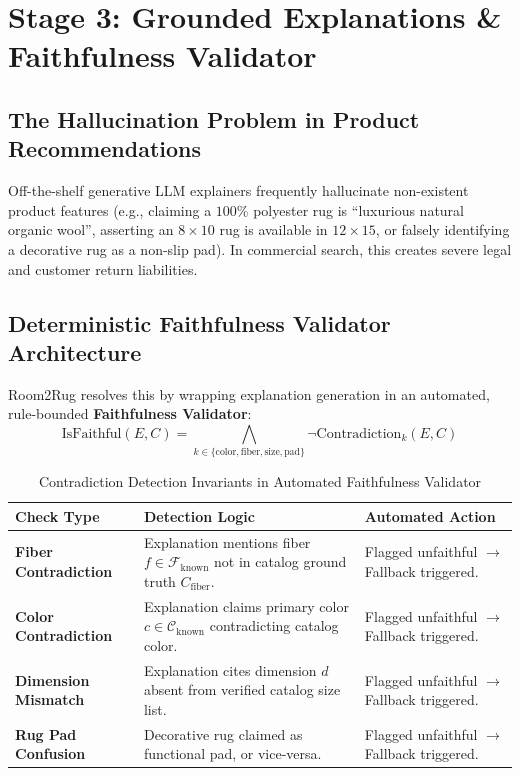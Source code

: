 \documentclass[11pt,a4paper]{article}
\begin{document}
\section{Stage 3: Grounded Explanations \& Faithfulness Validator}

\subsection{The Hallucination Problem in Product Recommendations}
Off-the-shelf generative LLM explainers frequently hallucinate non-existent product features (e.g., claiming a $100\%$ polyester rug is ``luxurious natural organic wool'', asserting an $8\times 10$ rug is available in $12\times 15$, or falsely identifying a decorative rug as a non-slip pad). In commercial search, this creates severe legal and customer return liabilities.

\subsection{Deterministic Faithfulness Validator Architecture}
Room2Rug resolves this by wrapping explanation generation in an automated, rule-bounded \textbf{Faithfulness Validator}:
\begin{equation}
\text{IsFaithful}(E, C) = \bigwedge_{k \in \{\text{color}, \text{fiber}, \text{size}, \text{pad}\}} \neg \text{Contradiction}_k(E, C)
\end{equation}

\begin{table}[htbp]
\centering
\small
\caption{Contradiction Detection Invariants in Automated Faithfulness Validator}
\label{tab:validator}
\begin{tabularx}{\textwidth}{lXp{4.2cm}}
\toprule
\textbf{Check Type} & \textbf{Detection Logic} & \textbf{Automated Action} \\
\midrule
\textbf{Fiber Contradiction} & Explanation mentions fiber $f \in \mathcal{F}_{\text{known}}$ not in catalog ground truth $C_{\text{fiber}}$. & Flagged unfaithful $\to$ Fallback triggered. \\
\textbf{Color Contradiction} & Explanation claims primary color $c \in \mathcal{C}_{\text{known}}$ contradicting catalog color. & Flagged unfaithful $\to$ Fallback triggered. \\
\textbf{Dimension Mismatch} & Explanation cites dimension $d$ absent from verified catalog size list. & Flagged unfaithful $\to$ Fallback triggered. \\
\textbf{Rug Pad Confusion} & Decorative rug claimed as functional pad, or vice-versa. & Flagged unfaithful $\to$ Fallback triggered. \\
\bottomrule
\end{tabularx}
\end{table}
\end{document}
